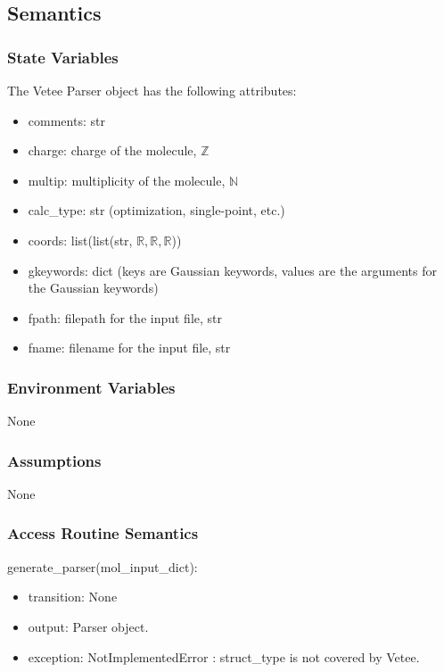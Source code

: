 \documentclass[12pt, titlepage]{article}
\begin{document}
\subsection{Semantics}

\subsubsection{State Variables}

The Vetee Parser object has the following attributes:
\begin{itemize}
	\item comments: str
	\item charge: charge of the molecule, $\mathbb{Z}$
	\item multip: multiplicity of the molecule, $\mathbb{N}$
	\item calc\_type: str (optimization, single-point, etc.)
	\item coords: list(list(str, $\mathbb{R}, \mathbb{R}, \mathbb{R}$))
	\item gkeywords: dict (keys are Gaussian keywords, values are the arguments 
	for the Gaussian keywords)
	\item fpath: filepath for the input file, str
	\item fname: filename for the input file, str
\end{itemize}

\subsubsection{Environment Variables}

None

\subsubsection{Assumptions}

None

\subsubsection{Access Routine Semantics}

\noindent generate\_parser(mol\_input\_dict):
\begin{itemize}
	\item transition: None
	\item output: Parser object.
	\item exception: NotImplementedError : struct\_type is not covered by Vetee.
\end{itemize}
\end{document}
